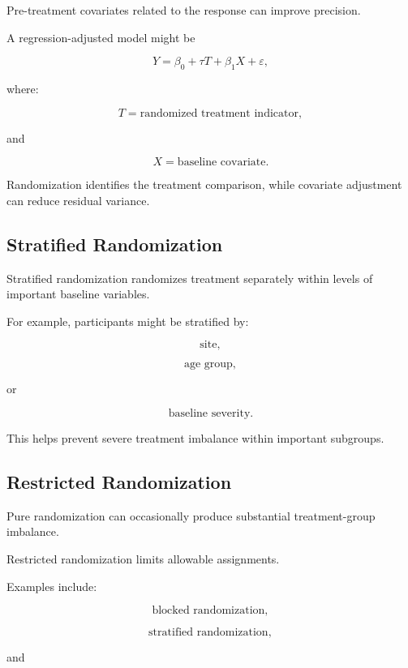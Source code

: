 Pre-treatment covariates related to the response can improve precision.

A regression-adjusted model might be

\[
\boxed{
Y
=
\beta_0
+
\tau T
+
\beta_1X
+
\varepsilon,
}
\]

where:

\[
T
=
\text{randomized treatment indicator},
\]

and

\[
X
=
\text{baseline covariate}.
\]

Randomization identifies the treatment comparison, while covariate
adjustment can reduce residual variance.

\subsection{Stratified Randomization}
\label{subsec:stratified-randomization}

Stratified randomization randomizes treatment separately within levels of
important baseline variables.

For example, participants might be stratified by:

\[
\boxed{
\text{site},
}
\]

\[
\boxed{
\text{age group},
}
\]

or

\[
\boxed{
\text{baseline severity}.
}
\]

This helps prevent severe treatment imbalance within important subgroups.

\subsection{Restricted Randomization}
\label{subsec:restricted-randomization}

Pure randomization can occasionally produce substantial treatment-group
imbalance.

Restricted randomization limits allowable assignments.

Examples include:

\[
\boxed{
\text{blocked randomization},
}
\]

\[
\boxed{
\text{stratified randomization},
}
\]

and


